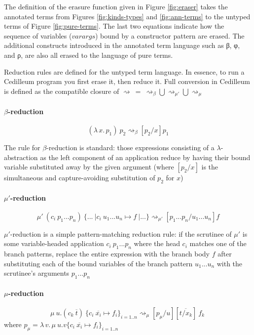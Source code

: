 \documentclass{article}
\newcommand{\absu}[3]{{#1}\, #2.\, #3}
\newcommand{\vars}[1]{{\overline{#1}}}
\newcommand{\reduce}{\ensuremath{\rightsquigarrow}}
\begin{document}
The definition of the erasure function given in Figure \ref{fig:eraser} takes
the annotated terms from Figures \ref{fig:kinds-types} and \ref{fig:ann-terms}
to the untyped terms of Figure \ref{fig:pure-terms}. The last two equations
indicate how the sequence of variables ($varargs$) bound by a constructor
pattern are erased. The additional constructs introduced in the annotated term
language such as β, φ, and ρ, are also all erased to the language of pure terms.

Reduction rules are defined for the untyped term language. In essence, to run a
Cedilleum program you first erase it, then reduce it. Full conversion in
Cedilleum is defined as the compatible closure of $\reduce\ =\ \reduce_{\beta}
\bigcup \reduce_{\mu'} \bigcup \reduce_{\mu}$

\paragraph{$\beta$-reduction}
\[ (\absu{\lambda}{x}{p_1})\ p_2 \reduce_{\beta} [p_2/x]p_1 \]

The rule for $\beta$-reduction is standard: those expressions consisting of a
$\lambda$-abstraction as the left component of an application reduce by having
their bound variable substituted away by the given argument (where $[p_2/x]$ is
the simultaneous and capture-avoiding substitution of $p_2$ for $x$)

\paragraph{$\mu'$-reduction}
\[ \mu'\ (c_i\ p_1 ... p_n)\ \{...\ | c_i\ u_1 ... u_n \mapsto f\ |...\}
  \reduce_{\mu'} [p_1 ... p_n/u_1 ... u_n]f\]

$\mu'$-reduction is a simple pattern-matching reduction rule: if the scrutinee
of $\mu'$ is some variable-headed application $c_i\ p_1 ... p_n$ where the head
$c_i$ matches one of the branch patterns, replace the entire expression with the
branch body $f$ after substituting each of the bound variables of the branch
pattern $u_1 ... u_n$ with the scrutinee's arguments $p_1 ... p_n$

\paragraph{$\mu$-reduction}
\[
  \mu\ u. (c_k\ \vars{t})\ \{ c_i\ \vars{x_i} \mapsto f_i\}_{i=1..n} \reduce_{\mu}
  [p_{\mu}/u][\vars{t/x_k}]\ f_k\
\]
\noindent where $p_{\mu} = \absu{\lambda}{v}{\mu\ u. v \{c_i\ \vars{x_i} \mapsto f_i\}_{i=1..n}}$
\\ 
\end{document}
